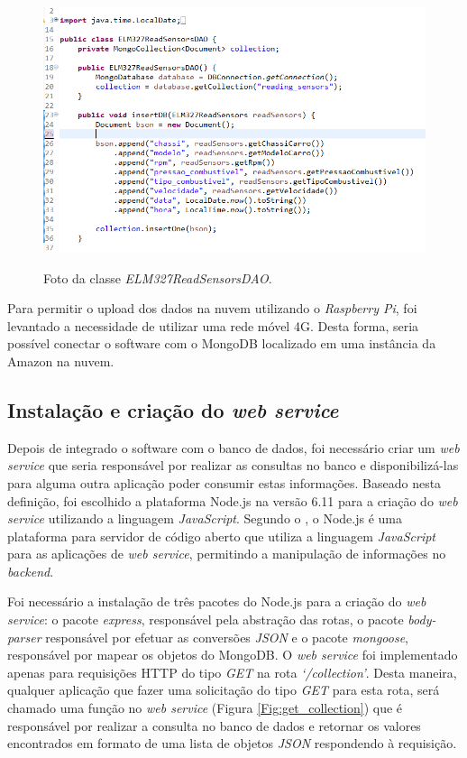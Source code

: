 \begin{figure}[!ht]
\centering
\caption{Foto da classe \textit{ELM327ReadSensorsDAO}.} 
{\includegraphics[scale=.66]{imagens/pacoteDao-ELM327ReadSensorsDAO.png}}\\
 \label{Fig:elm327_read_sensors_dao}
\end{figure}

Para permitir o upload dos dados na nuvem utilizando o \textit{Raspberry Pi}, foi levantado a necessidade de utilizar uma rede móvel 4G. Desta forma, seria possível conectar o software com o MongoDB localizado em uma instância da Amazon na nuvem.

\subsection{\textbf{Instalação e criação do \textit{web service}}}
Depois de integrado o software com o banco de dados, foi necessário criar um \textit{web service} que seria responsável por realizar as consultas no banco e disponibilizá-las para alguma outra aplicação poder consumir estas informações. Baseado nesta definição, foi escolhido a plataforma Node.js na versão 6.11 para a criação do \textit{web service} utilizando a linguagem \textit{JavaScript}. Segundo o , o Node.js é uma plataforma para servidor de código aberto que utiliza a linguagem \textit{JavaScript} para as aplicações de \textit{web service}, permitindo a manipulação de informações no \textit{backend}.

Foi necessário a instalação de três pacotes do Node.js para a criação do \textit{web service}: o pacote \textit{express}, responsável pela abstração das rotas, o pacote \textit{body-parser} responsável por efetuar as conversões \textit{JSON} e o pacote \textit{mongoose}, responsável por mapear os objetos do MongoDB. O \textit{web service} foi implementado apenas para requisições HTTP do tipo \textit{GET} na rota \textit{‘/collection’}. Desta maneira, qualquer aplicação que fazer uma solicitação do tipo \textit{GET} para esta rota, será chamado uma função no \textit{web service} (Figura \ref{Fig:get_collection}) que é responsável por realizar a consulta no banco de dados e retornar os valores encontrados em formato de uma lista de objetos \textit{JSON} respondendo à requisição.


